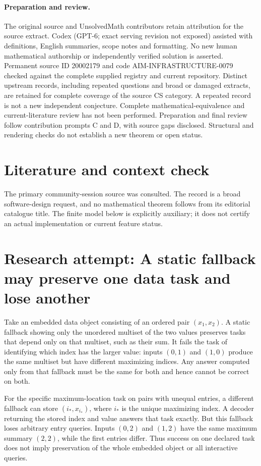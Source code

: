 \documentclass[11pt]{article}
\begin{document}
\paragraph{Preparation and review.}
The original source and UnsolvedMath contributors retain attribution for the source extract. Codex (GPT-6; exact serving revision not exposed) assisted with definitions, English summaries, scope notes and formatting. No new human mathematical authorship or independently verified solution is asserted. Permanent source ID 20002179 and code AIM-INFRASTRUCTURE-0079 checked against the complete supplied registry and current repository. Distinct upstream records, including repeated questions and broad or damaged extracts, are retained for complete coverage of the source CS category. A repeated record is not a new independent conjecture. Complete mathematical-equivalence and current-literature review has not been performed. Preparation and final review follow contribution prompts C and D, with source gaps disclosed. Structural and rendering checks do not establish a new theorem or open status.
\label{end:20002179}

\section{Literature and context check}
The primary community-session source was consulted. The record is a broad software-design request, and no mathematical theorem follows from its editorial catalogue title. The finite model below is explicitly auxiliary; it does not certify an actual implementation or current feature status.
\section{Research attempt: A static fallback may preserve one data task and lose another}
Take an embedded data object consisting of an ordered pair $(x_1,x_2)$. A static fallback showing only the unordered multiset of the two values preserves tasks that depend only on that multiset, such as their sum. It fails the task of identifying which index has the larger value: inputs $(0,1)$ and $(1,0)$ produce the same multiset but have different maximizing indices. Any answer computed only from that fallback must be the same for both and hence cannot be correct on both.

For the specific maximum-location task on pairs with unequal entries, a different fallback can store $(i_*,x_{i_*})$, where $i_*$ is the unique maximizing index. A decoder returning the stored index and value answers that task exactly. But this fallback loses arbitrary entry queries. Inputs $(0,2)$ and $(1,2)$ have the same maximum summary $(2,2)$, while the first entries differ. Thus success on one declared task does not imply preservation of the whole embedded object or all interactive queries.
\end{document}
